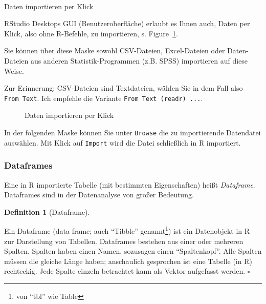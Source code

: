 \documentclass[
  letterpaper,
  DIV=11,
  numbers=noendperiod]{scrartcl}
\makeatletter
\let\oldparagraph\paragraph
\renewcommand{\paragraph}{
    \@ifstar
      \xxxParagraphStar
      \xxxParagraphNoStar
  }
\newcommand{\xxxParagraphStar}[1]{\oldparagraph*{#1}\mbox{}}
\newcommand{\xxxParagraphNoStar}[1]{\oldparagraph{#1}\mbox{}}
\theoremstyle{definition}
\theoremstyle{definition}
\theoremstyle{definition}
\newtheorem{definition}{Definition}[section]
\theoremstyle{remark}
\makeatother
\begin{document}
\paragraph{Daten importieren per
Klick}\label{daten-importieren-per-klick}

RStudio Desktops GUI (Benutzeroberfläche) erlaubt es Ihnen auch, Daten
per Klick, also ohne R-Befehle, zu importieren, s.
Figure~\ref{fig-daten-rstudio}.

Sie können über diese Maske sowohl CSV-Dateien, Excel-Dateien oder
Daten-Dateien aus anderen Statistik-Programmen (z.B. SPSS) importieren
auf diese Weise.

Zur Erinnerung: CSV-Dateien sind Textdateien, wählen Sie in dem Fall
also \texttt{From\ Text}. Ich empfehle die Variante
\texttt{From\ Text\ (readr)\ ...}.

\begin{figure}


\caption{\label{fig-daten-rstudio}Daten importieren per Klick}

\end{figure}%

In der folgenden Maske können Sie unter \texttt{Browse} die zu
importierende Datendatei auswählen. Mit Klick auf \texttt{Import} wird
die Datei schließlich in R importiert.

\subsubsection{Dataframes}\label{dataframes}

Eine in R importierte Tabelle (mit bestimmten Eigenschaften) heißt
\emph{Dataframe}. Dataframes sind in der Datenanalyse von großer
Bedeutung.

\begin{definition}[Dataframe]\protect\hypertarget{def-dataframe}{}\label{def-dataframe}

Ein Dataframe (data frame; auch ``Tibble'' genannt\footnote{von ``tbl''
  wie Table}) ist ein Datenobjekt in R zur Darstellung von Tabellen.
Dataframes bestehen aus einer oder mehreren Spalten. Spalten haben einen
Namen, sozusagen einen ``Spaltenkopf''. Alle Spalten müssen die gleiche
Länge haben; anschaulich gesprochen ist eine Tabelle (in R) rechteckig.
Jede Spalte einzeln betrachtet kann als Vektor aufgefasst werden.
\(\square\)

\end{definition}
\end{document}
